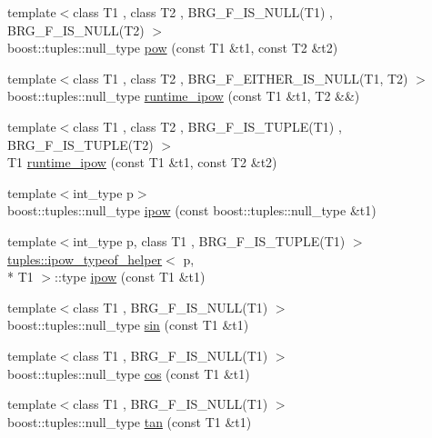 \begin{DoxyCompactItemize}
\item 
{\footnotesize template$<$class T1 , class T2 , B\-R\-G\-\_\-\-F\-\_\-\-I\-S\-\_\-\-N\-U\-L\-L(\-T1) , B\-R\-G\-\_\-\-F\-\_\-\-I\-S\-\_\-\-N\-U\-L\-L(\-T2) $>$ }\\boost\-::tuples\-::null\-\_\-type \hyperlink{namespaceIceBRG_a1df1260c6f6ca6ef2b2d336f2908825b}{pow} (const T1 \&t1, const T2 \&t2)
\item 
{\footnotesize template$<$class T1 , class T2 , B\-R\-G\-\_\-\-F\-\_\-\-E\-I\-T\-H\-E\-R\-\_\-\-I\-S\-\_\-\-N\-U\-L\-L(\-T1, T2) $>$ }\\boost\-::tuples\-::null\-\_\-type \hyperlink{namespaceIceBRG_ae5afc3a219af15dc1c73a15ca40486ce}{runtime\-\_\-ipow} (const T1 \&t1, T2 \&\&)
\item 
{\footnotesize template$<$class T1 , class T2 , B\-R\-G\-\_\-\-F\-\_\-\-I\-S\-\_\-\-T\-U\-P\-L\-E(\-T1) , B\-R\-G\-\_\-\-F\-\_\-\-I\-S\-\_\-\-T\-U\-P\-L\-E(\-T2) $>$ }\\T1 \hyperlink{namespaceIceBRG_a7b6ce9eb65d0d796d9a8239a620aa50c}{runtime\-\_\-ipow} (const T1 \&t1, const T2 \&t2)
\item 
{\footnotesize template$<$int\-\_\-type p$>$ }\\boost\-::tuples\-::null\-\_\-type \hyperlink{namespaceIceBRG_ae7f18ccc5167613b85197709db7a0622}{ipow} (const boost\-::tuples\-::null\-\_\-type \&t1)
\item 
{\footnotesize template$<$int\-\_\-type p, class T1 , B\-R\-G\-\_\-\-F\-\_\-\-I\-S\-\_\-\-T\-U\-P\-L\-E(\-T1) $>$ }\\\hyperlink{namespaceIceBRG_1_1tuples_structIceBRG_1_1tuples_1_1ipow__typeof__helper}{tuples\-::ipow\-\_\-typeof\-\_\-helper}$<$ p, \\*
T1 $>$\-::type \hyperlink{namespaceIceBRG_a32105d97f288cf7ddc6359c296ad616b}{ipow} (const T1 \&t1)
\item 
{\footnotesize template$<$class T1 , B\-R\-G\-\_\-\-F\-\_\-\-I\-S\-\_\-\-N\-U\-L\-L(\-T1) $>$ }\\boost\-::tuples\-::null\-\_\-type \hyperlink{namespaceIceBRG_ac211c1b7a59b3aa4c1a53a69bdac081c}{sin} (const T1 \&t1)
\item 
{\footnotesize template$<$class T1 , B\-R\-G\-\_\-\-F\-\_\-\-I\-S\-\_\-\-N\-U\-L\-L(\-T1) $>$ }\\boost\-::tuples\-::null\-\_\-type \hyperlink{namespaceIceBRG_a44e715f6354ca547283ab042e1577a70}{cos} (const T1 \&t1)
\item 
{\footnotesize template$<$class T1 , B\-R\-G\-\_\-\-F\-\_\-\-I\-S\-\_\-\-N\-U\-L\-L(\-T1) $>$ }\\boost\-::tuples\-::null\-\_\-type \hyperlink{namespaceIceBRG_a8a5983167146faac01720ff2ba36a51c}{tan} (const T1 \&t1)

\end{DoxyCompactItemize}

